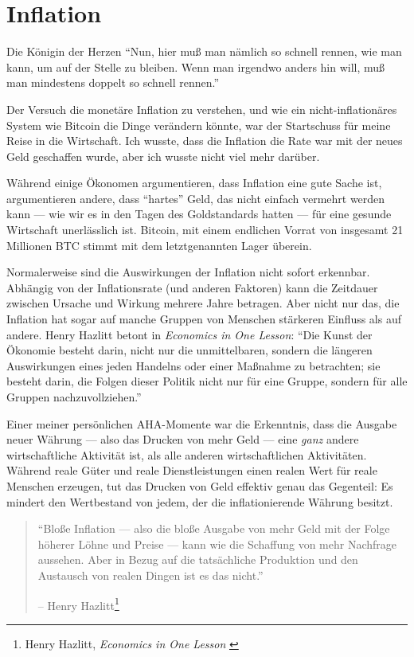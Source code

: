 \chapter{Inflation}
\label{les:9}

\begin{chapquote}{Die Königin der Herzen}
\enquote{Nun, hier muß man nämlich so schnell rennen, wie man kann, um auf der
Stelle zu bleiben. Wenn man irgendwo anders hin will, muß man mindestens doppelt
so schnell rennen.}
\end{chapquote}

Der Versuch die monetäre Inflation zu verstehen, und wie ein nicht-inflationäres
System wie Bitcoin die Dinge verändern könnte, war der Startschuss für meine
Reise in die Wirtschaft. Ich wusste, dass die Inflation die Rate war mit der
neues Geld geschaffen wurde, aber ich wusste nicht viel mehr darüber.

Während einige Ökonomen argumentieren, dass Inflation eine gute Sache ist,
argumentieren andere, dass \enquote{hartes} Geld, das nicht einfach vermehrt
werden kann — wie wir es in den Tagen des Goldstandards hatten --- für eine
gesunde Wirtschaft unerlässlich ist. Bitcoin, mit einem endlichen Vorrat von
insgesamt 21 Millionen BTC stimmt mit dem letztgenannten Lager überein.

Normalerweise sind die Auswirkungen der Inflation nicht sofort erkennbar.
Abhängig von der Inflationsrate (und anderen Faktoren) kann die Zeitdauer
zwischen Ursache und Wirkung mehrere Jahre betragen. Aber nicht nur das, die
Inflation hat sogar auf manche Gruppen von Menschen stärkeren Einfluss als auf
andere. Henry Hazlitt betont in \textit{Economics in One Lesson}: \enquote{Die
Kunst der Ökonomie besteht darin, nicht nur die unmittelbaren, sondern die
längeren Auswirkungen eines jeden Handelns oder einer Maßnahme zu betrachten;
sie besteht darin, die Folgen dieser Politik nicht nur für eine Gruppe, sondern
für alle Gruppen nachzuvollziehen.}

Einer meiner persönlichen AHA-Momente war die Erkenntnis, dass die Ausgabe neuer
Währung --- also das Drucken von mehr Geld --- eine \textit{ganz} andere
wirtschaftliche Aktivität ist, als alle anderen wirtschaftlichen Aktivitäten.
Während reale Güter und reale Dienstleistungen einen realen Wert für reale
Menschen erzeugen, tut das Drucken von Geld effektiv genau das Gegenteil: Es
mindert den Wertbestand von jedem, der die inflationierende Währung besitzt.

\begin{quotation}\begin{samepage}
\enquote{Bloße Inflation --- also die bloße Ausgabe von mehr Geld mit der Folge
höherer Löhne und Preise --- kann wie die Schaffung von mehr Nachfrage aussehen.
Aber in Bezug auf die tatsächliche Produktion und den Austausch von realen
Dingen ist es das nicht.}
\begin{flushright} -- Henry Hazlitt\footnote{Henry Hazlitt, \textit{Economics in
One Lesson} \cite{hazlitt}}
\end{flushright}\end{samepage}\end{quotation}

